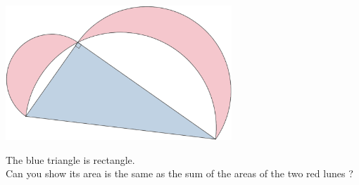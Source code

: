 \documentclass[12pt,a4paper,article,english,firamath]{nsi}
\begin{document}
\maketitle
\begin{center}
    \includegraphics[width=8.5cm]{img/lunes.png}
\end{center}
The blue triangle is rectangle.\\
Can you show its area is the same as the sum of the areas of the two red lunes ?
\end{document}
